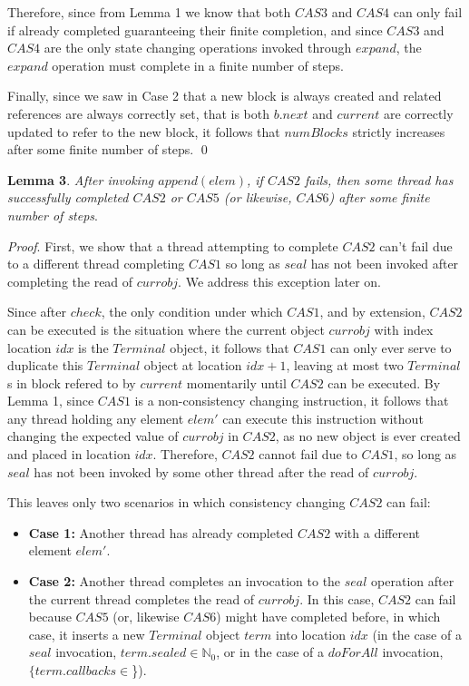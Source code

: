 \documentclass[runningheads,a4paper]{llncs}
\begin{document}
Therefore, since from Lemma 1 we know that both $CAS3$ and $CAS4$ can only
fail if already completed guaranteeing their finite completion, and since
$CAS3$ and $CAS4$ are the only state changing operations invoked through
$expand$, the $expand$ operation must complete in a finite number of steps.

Finally, since we saw in Case 2 that a new block is always created and related
references are always correctly set, that is both $b.next $ and $current$ are
correctly updated to refer to the new block, it follows that $numBlocks$
strictly increases after some finite number of steps.
\qed


\textbf{Lemma 3}. \textit{After invoking $append(elem)$, if $CAS2$ fails, then
some thread has successfully completed $CAS2$ or $CAS5$ (or likewise, $CAS6$)
after some finite number of steps}.

\textit{Proof}. First, we show that a thread attempting to complete $CAS2$
can't fail due to a different thread completing $CAS1$ so long as $seal$ has
not been invoked after completing the read of $currobj$. We address this
exception later on.

Since after $check$, the only condition under which $CAS1$, and by extension,
$CAS2$ can be executed is the situation where the current object $currobj$
with index location $idx$ is the $Terminal$ object, it follows that $CAS1$ can
only ever serve to duplicate this $Terminal$ object at location $idx+1$,
leaving at most two $Terminal$s in block refered to by $current$ momentarily
until $CAS2$ can be executed. By Lemma 1, since $CAS1$ is a non-consistency
changing instruction, it follows that any thread holding any element $elem'$
can execute this instruction without changing the expected value of $currobj$
in $CAS2$, as no new object is ever created and placed in location $idx$.
Therefore, $CAS2$ cannot fail due to $CAS1$, so long as $seal$ has not been
invoked by some other thread after the read of $currobj$.

This leaves only two scenarios in which consistency changing $CAS2$ can fail:

\begin{itemize}
\item \textbf{Case 1:} Another thread has already completed $CAS2$ with a 
different element $elem'$.
\item \textbf{Case 2:} Another thread completes an invocation to the $seal$ 
operation after the current thread completes the read of $currobj$. In this 
case, $CAS2$ can fail because $CAS5$ (or, likewise $CAS6$) might have 
completed before, in which case, it inserts a new $Terminal$ object $term$ 
into location $idx$ (in the case of a $seal$ invocation, 
$term.sealed\in\mathbb{N}_0$, or in the case of a $doForAll$ invocation, 
$\{term.callbacks\in$\}). 
\end{itemize}
\end{document}
